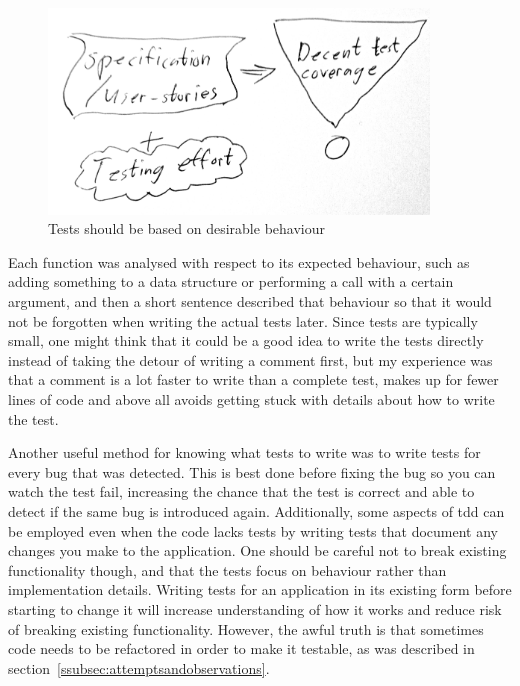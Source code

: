 \documentclass[11pt]{article}
\begin{document}
\begin{figure}[h!]
\centering
\includegraphics[width=0.9\textwidth]{pics/coverage.jpg}
\caption{Tests should be based on desirable behaviour}
\label{fig:coverage}
\end{figure}

Each function was analysed with respect to its expected behaviour, such as adding something to a data structure or performing a call with a certain argument, and then a short sentence described that behaviour so that it would not be forgotten when writing the actual tests later. Since tests are typically small, one might think that it could be a good idea to write the tests directly instead of taking the detour of writing a comment first, but my experience was that a comment is a lot faster to write than a complete test, makes up for fewer lines of code and above all avoids getting stuck with details about how to write the test.

Another useful method for knowing what tests to write was to write tests for every bug that was detected. This is best done before fixing the bug so you can watch the test fail, increasing the chance that the test is correct and able to detect if the same bug is introduced again. Additionally, some aspects of \gls{tdd} can be employed even when the code lacks tests by writing tests that document any changes you make to the application. One should be careful not to break existing functionality though, and that the tests focus on behaviour rather than implementation details. Writing tests for an application in its existing form before starting to change it will increase understanding of how it works and reduce risk of breaking existing functionality. However, the awful truth is that sometimes code needs to be refactored in order to make it testable, as was described in section~\ref{ssubsec:attemptsandobservations}.
\end{document}
